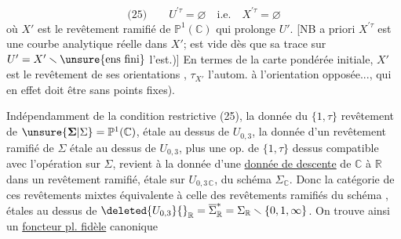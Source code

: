 \[
\text{(25)}\qquad U^{\prime\tau}=\varnothing\quad\text{i.e.}\quad X^{\prime\tau}=\varnothing
\]
où $X'$ est le revêtement ramifié de $\mathbb P^1(\mathbb C)$ qui prolonge $U'$. [NB  a priori $X^{\prime\tau}$ est une courbe analytique réelle  dans $X'$;  est  vide dès que sa trace sur $U'=X'\smallsetminus\unsure{\text{ens fini}}$  l'est.)]  En termes de la carte pondérée initiale, $X'$ est le revêtement de ses orientations , $\tau_{X'}$  l'autom.   à l'orientation opposée..., qui en effet doit être sans points fixes).

Indépendamment de la condition restrictive (25), la donnée du $\{1,\tau\}$ revêtement  de $\unsure{\boldsymbol{\Sigma}|\Sigma}=\mathbb P^1(\mathbb C)$,
étale au dessus de \inserted{$\overline\Sigma^*=$} $U_{0,3}$,  la donnée d'un revêtement ramifié de $\Sigma$ étale au dessus de $U_{0,3}$, plus une op. de $\{1,\tau\}$ dessus compatible avec l'opération sur $\Sigma$, revient à la donnée d'une \uline{donnée de descente} de $\mathbb C$ à $\mathbb R$ dans un revêtement ramifié, étale sur $U_{0,3\,\mathbb C}$, du \deleted{$\unsure{\Sigma}$}schéma $\Sigma_{\mathbb C}$. Donc la catégorie de ces revêtements mixtes  équivalente à celle des revêtements ramifiés du schéma , étales au dessus de $\deleted{U_{0,3}}{}_{\mathbb R}=\overline\Sigma_{\mathbb R}^*=\Sigma_{\mathbb R}\smallsetminus\{0,1,\infty\}$. On trouve ainsi un \uline{foncteur pl. fidèle} canonique

